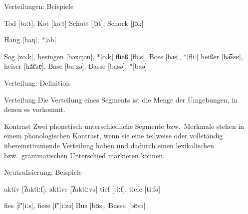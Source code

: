 \begin{frame}
  {Verteilungen: Beispiele}
  \pause
  \begin{exe}
    \ex
      \begin{xlist}
        \ex Tod [\alert{t}oːt], Kot [\alert{k}oːt]
        \pause
        \ex Schott [ʃɔ\alert{t}], Schock [ʃɔ\alert{k}]
      \end{xlist}
        \pause
        \ex Hang [ha\alert{ŋ}], *[ah]
        \pause
    \ex
      \begin{xlist}
        \ex Sog [\alert{z}oːk], besingen [bə\alert{z}ɪŋən], *[oːk]
        \pause
        \ex fließ [fliː\alert{s}], Boss [bɔ\alert{s}], *[fliː]
        \pause
        \ex heißer [ha͡ɛ\alert{s}ɐ], heiser [ha͡ɛ\alert{z}ɐ], Base [baː\alert{z}ə], Basse [ba\alert{s}ə], *[baə]
      \end{xlist}
  \end{exe}
\end{frame}


\begin{frame}
  {Verteilung: Definition}
  \pause
  \Large
  \begin{block}{Verteilung}
    Die Verteilung eines Segments ist die Menge der Umgebungen, in denen es vorkommt.
  \end{block}
  \pause
  \Zeile
  \begin{block}{Kontrast}
    Zwei phonetisch unterschiedliche Segmente bzw.\ Merkmale stehen in einem phonologischen 
  Kontrast, wenn sie eine teilweise oder vollständig übereinstimmende Verteilung haben und dadurch einen lexikalischen bzw.\ grammatischen Unterschied markieren können.
  \end{block}
\end{frame}

\begin{frame}
  {Neutralisierung: Beispiele}
  \pause
  \begin{exe}
    \ex
    \begin{xlist}
      \pause
      \pause
    \end{xlist}
    \ex
    \begin{xlist}
      \pause
      \pause
    \end{xlist}
    \ex
    \begin{xlist}
      \pause
      \pause
    \end{xlist}
    \ex
    \begin{xlist}
      \ex aktiv [ʔaktiːf], aktive [ʔaktiːvə]
      \pause
      \ex tief [tiːf], tiefe [tiːfə]
      \pause
    \end{xlist}
    \ex
    \begin{xlist}
      \ex fies [f"|iːs], fiese [f"|iːzə]
      \pause
      \ex Bus [bʊs], Busse [bʊsə]
      \pause
    \end{xlist}
  \end{exe}
\end{frame}


